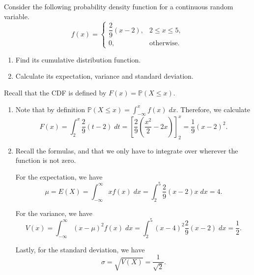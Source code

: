 \documentclass[../main.tex]{subfiles}
\begin{document}
\begin{exercise}
  Consider the following probability density function for a continuous random variable.
  \[
    f(x) =
    \begin{cases}
      \dfrac{2}{9} (x - 2), & 2 \le x \le 5, \\[6pt]
      0, & \text{otherwise}.
    \end{cases}
  \]

  \begin{enumerate}
    \item Find its cumulative distribution function.
    \item Calculate its expectation, variance and standard deviation.
  \end{enumerate}

  \begin{solution}
    Recall that the CDF is defined by \(F(x) = \mathbb{P}(X \le x)\).

    \begin{enumerate}
      \item Note that by definition \(\mathbb{P}(X \le x) = \int_{-\infty}^{x} f(x) \;dx\). Therefore, we calculate
        \[
          F(x) = \int_{2}^{x} \frac{2}{9}(t - 2) \;dt = \left[ \frac{2}{9}\left( \frac{x^{2}}{2} - 2x \right) \right]_{2}^{x} = \frac{1}{9}(x - 2)^{2}.
        \]

      \item Recall the formulas, and that we only have to integrate over wherever the function is not zero.

        For the expectation, we have
        \[
          \mu = E(X) = \int_{-\infty}^{\infty} xf(x) \;dx = \int_{2}^{5} \frac{2}{9}(x - 2)x \;dx = 4.
        \]

        For the variance, we have
        \[
          V(x) = \int_{-\infty}^{\infty} (x - \mu)^{2} f(x) \;dx = \int_{2}^{5} (x - 4)^{2} \frac{2}{9}(x - 2) \;dx = \frac{1}{2}.
        \]
        
        Lastly, for the standard deviation, we have
        \[
          \sigma = \sqrt{V(X)} = \frac{1}{\sqrt{2}}.
        \]
    \end{enumerate}
  \end{solution}
\end{exercise}
\end{document}
